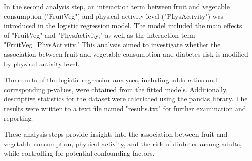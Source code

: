 \documentclass[12pt]{article}
\begin{document}
In the second analysis step, an interaction term between fruit and vegetable consumption ("FruitVeg") and physical activity level ("PhysActivity") was introduced in the logistic regression model. The model included the main effects of "FruitVeg" and "PhysActivity," as well as the interaction term "FruitVeg\_PhysActivity." This analysis aimed to investigate whether the association between fruit and vegetable consumption and diabetes risk is modified by physical activity level.

The results of the logistic regression analyses, including odds ratios and corresponding p-values, were obtained from the fitted models. Additionally, descriptive statistics for the dataset were calculated using the pandas library. The results were written to a text file named "results.txt" for further examination and reporting. 

These analysis steps provide insights into the association between fruit and vegetable consumption, physical activity, and the risk of diabetes among adults, while controlling for potential confounding factors.
\end{document}
